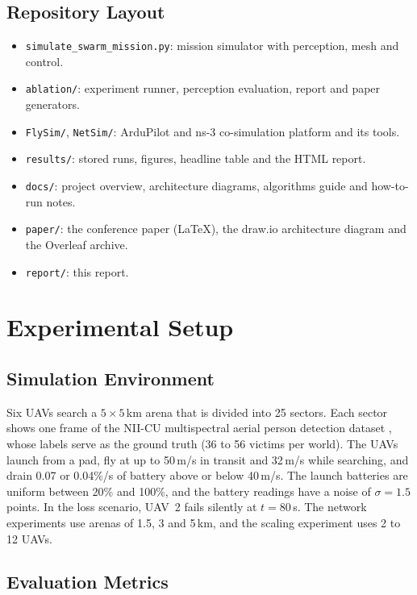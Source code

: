 \documentclass[10pt,letterpaper]{article}
\begin{document}
\subsection{Repository Layout}
\begin{itemize}
\item \texttt{simulate\_swarm\_mission.py}: mission simulator with perception, mesh and control.
\item \texttt{ablation/}: experiment runner, perception evaluation, report and paper generators.
\item \texttt{FlySim/}, \texttt{NetSim/}: ArduPilot and ns-3 co-simulation platform and its tools.
\item \texttt{results/}: stored runs, figures, headline table and the HTML report.
\item \texttt{docs/}: project overview, architecture diagrams, algorithms guide and how-to-run notes.
\item \texttt{paper/}: the conference paper (LaTeX), the draw.io architecture diagram and the Overleaf archive.
\item \texttt{report/}: this report.
\end{itemize}

\section{Experimental Setup}\label{sec:setup}
\subsection{Simulation Environment}
Six UAVs search a $5\times5$\,km arena that is divided into 25 sectors. Each sector shows one frame of the NII-CU multispectral aerial person detection dataset \cite{speth2022}, whose labels serve as the ground truth (36 to 56 victims per world). The UAVs launch from a pad, fly at up to 50\,m/s in transit and 32\,m/s while searching, and drain 0.07 or 0.04\%/s of battery above or below 40\,m/s. The launch batteries are uniform between 20\% and 100\%, and the battery readings have a noise of $\sigma=1.5$ points. In the loss scenario, UAV~2 fails silently at $t=80$\,s. The network experiments use arenas of 1.5, 3 and 5\,km, and the scaling experiment uses 2 to 12 UAVs.

\subsection{Evaluation Metrics}
\end{document}
